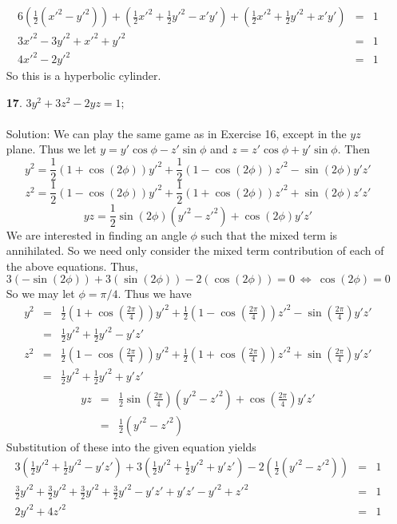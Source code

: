 \documentclass[12pt]{amsbook}
\begin{document}
\begin{enumerate}
\begin{eqnarray*}
6(\frac{1}{2}(x'^2-y'^2))+(\frac{1}{2}x'^2+\frac{1}{2}y'^2-x'y')+(\frac{1}{2}x'^2+\frac{1}{2}y'^2+x'y')&=&1\\
3x'^2-3y'^2+x'^2+y'^2&=&1\\
4x'^2-2y'^2&=&1
\end{eqnarray*}
So this is a hyperbolic cylinder.
\\
\item[{\small\bf 17}.]\quad  $3y^2+3z^2-2yz=1$;
\\
\\
{\sc Solution}: We can play the same game as in Exercise 16, except in the $yz$ plane. Thus we let $y=y'\cos\phi-z'\sin\phi$ and $z=z'\cos\phi+y'\sin\phi$. Then
$$y^2=\frac{1}{2}(1+\cos(2\phi))y'^2+\frac{1}{2}(1-\cos(2\phi))z'^2-\sin(2\phi)y'z'$$
$$z^2=\frac{1}{2}(1-\cos(2\phi))y'^2+\frac{1}{2}(1+\cos(2\phi))z'^2+\sin(2\phi)z'z'$$
$$yz=\frac{1}{2}\sin(2\phi)(y'^2-z'^2)+\cos(2\phi)y'z'$$
We are interested in finding an angle $\phi$ such that the mixed term is annihilated. So we need only consider the mixed term contribution of each of the above equations. Thus,
$$3(-\sin(2\phi))+3(\sin(2\phi))-2(\cos(2\phi))=0 \ \Leftrightarrow \ \cos(2\phi)=0$$
So we may let $\phi=\pi/4$. Thus we have
\begin{eqnarray*}
y^2&=&\frac{1}{2}(1+\cos(\frac{2\pi}{4}))y'^2+\frac{1}{2}(1-\cos(\frac{2\pi}{4}))z'^2-\sin(\frac{2\pi}{4})y'z'\\
&=&\frac{1}{2}y'^2+\frac{1}{2}y'^2-y'z'
\end{eqnarray*}
\begin{eqnarray*}
z^2&=&\frac{1}{2}(1-\cos(\frac{2\pi}{4}))y'^2+\frac{1}{2}(1+\cos(\frac{2\pi}{4}))z'^2+\sin(\frac{2\pi}{4})y'z'\\
&=&\frac{1}{2}y'^2+\frac{1}{2}y'^2+y'z'
\end{eqnarray*}
\begin{eqnarray*}
yz&=&\frac{1}{2}\sin(\frac{2\pi}{4})(y'^2-z'^2)+\cos(\frac{2\pi}{4})y'z'\\
&=&\frac{1}{2}(y'^2-z'^2)
\end{eqnarray*}
Substitution of these into the given equation yields
\begin{eqnarray*}
3(\frac{1}{2}y'^2+\frac{1}{2}y'^2-y'z')+3(\frac{1}{2}y'^2+\frac{1}{2}y'^2+y'z')-2(\frac{1}{2}(y'^2-z'^2))&=&1\\
\frac{3}{2}y'^2+\frac{3}{2}y'^2+\frac{3}{2}y'^2+\frac{3}{2}y'^2-y'z'+y'z'-y'^2+z'^2&=&1\\
2y'^2+4z'^2&=&1
\end{eqnarray*}

\end{enumerate}
\end{document}
